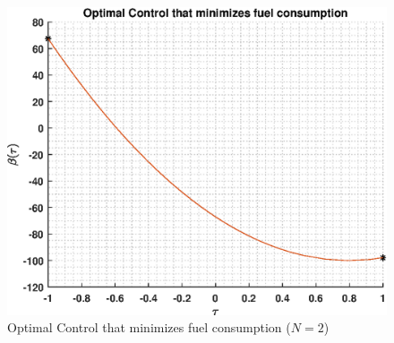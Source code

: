 \documentclass[]{article}
\begin{document}
\begin{figure}
	\centering
	\includegraphics[scale=0.75]{directControlPoly2.eps}
	\caption{Optimal Control that minimizes fuel consumption  (\(N = 2\))}
	\label{fig:directControlPoly2}
\end{figure}
\FloatBarrier
\end{document}
